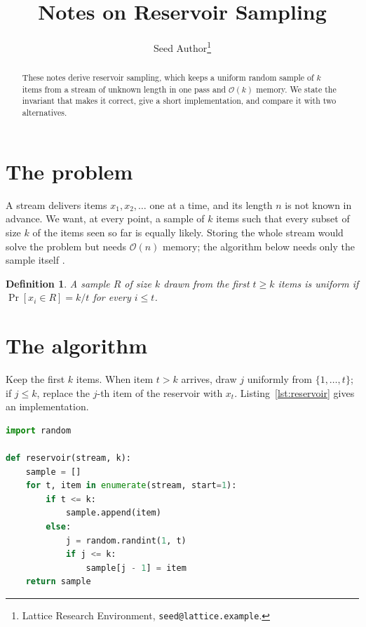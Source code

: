 \documentclass[11pt]{article}
\title{Notes on Reservoir Sampling}
\author{Seed Author\thanks{Lattice Research Environment, \texttt{seed@lattice.example}.}}
\date{}
\newtheorem{definition}{Definition}
\newcommand{\Oh}{\mathcal{O}}
\begin{document}
\maketitle

\begin{abstract}
These notes derive reservoir sampling, which keeps a uniform random sample of $k$ items from a stream of unknown length in one pass and $\Oh(k)$ memory.
We state the invariant that makes it correct, give a short implementation, and compare it with two alternatives.
\end{abstract}

\section{The problem}
\label{sec:problem}

A stream delivers items $x_1, x_2, \ldots$ one at a time, and its length $n$ is not known in advance.
We want, at every point, a sample of $k$ items such that every subset of size $k$ of the items seen so far is equally likely.
Storing the whole stream would solve the problem but needs $\Oh(n)$ memory; the algorithm below needs only the sample itself \cite{vitter1985random}.

\begin{definition}
\label{def:uniform}
A sample $R$ of size $k$ drawn from the first $t \ge k$ items is \emph{uniform} if $\Pr[x_i \in R] = k/t$ for every $i \le t$.
\end{definition}

\section{The algorithm}
\label{sec:algorithm}

Keep the first $k$ items.
When item $t > k$ arrives, draw $j$ uniformly from $\{1, \ldots, t\}$; if $j \le k$, replace the $j$-th item of the reservoir with $x_t$.
Listing~\ref{lst:reservoir} gives an implementation.

\begin{lstlisting}[language=Python, caption={Reservoir sampling in Python.}, label={lst:reservoir}]
import random

def reservoir(stream, k):
    sample = []
    for t, item in enumerate(stream, start=1):
        if t <= k:
            sample.append(item)
        else:
            j = random.randint(1, t)
            if j <= k:
                sample[j - 1] = item
    return sample
\end{lstlisting}
\end{document}
